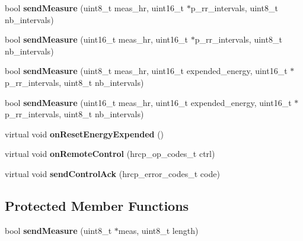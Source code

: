 \begin{DoxyCompactItemize}
\item 
\hypertarget{classble_heart_rate_ab511f6fcb6b7b57c09132911b5f87cb7}{bool {\bfseries send\-Measure} (uint8\-\_\-t meas\-\_\-hr, uint16\-\_\-t $\ast$p\-\_\-rr\-\_\-intervals, uint8\-\_\-t nb\-\_\-intervals)}\label{classble_heart_rate_ab511f6fcb6b7b57c09132911b5f87cb7}

\item 
\hypertarget{classble_heart_rate_a1d3fd3348703d304cd445620e7bb4998}{bool {\bfseries send\-Measure} (uint16\-\_\-t meas\-\_\-hr, uint16\-\_\-t $\ast$p\-\_\-rr\-\_\-intervals, uint8\-\_\-t nb\-\_\-intervals)}\label{classble_heart_rate_a1d3fd3348703d304cd445620e7bb4998}

\item 
\hypertarget{classble_heart_rate_a2a6d1f10ea9a92ad5a953fc683125c50}{bool {\bfseries send\-Measure} (uint8\-\_\-t meas\-\_\-hr, uint16\-\_\-t expended\-\_\-energy, uint16\-\_\-t $\ast$p\-\_\-rr\-\_\-intervals, uint8\-\_\-t nb\-\_\-intervals)}\label{classble_heart_rate_a2a6d1f10ea9a92ad5a953fc683125c50}

\item 
\hypertarget{classble_heart_rate_ab5cf3fd6c2e5909af4d51150c865d8b0}{bool {\bfseries send\-Measure} (uint16\-\_\-t meas\-\_\-hr, uint16\-\_\-t expended\-\_\-energy, uint16\-\_\-t $\ast$p\-\_\-rr\-\_\-intervals, uint8\-\_\-t nb\-\_\-intervals)}\label{classble_heart_rate_ab5cf3fd6c2e5909af4d51150c865d8b0}

\item 
\hypertarget{classble_heart_rate_a4764687c0e158518141b3dba9103b5d2}{virtual void {\bfseries on\-Reset\-Energy\-Expended} ()}\label{classble_heart_rate_a4764687c0e158518141b3dba9103b5d2}

\item 
\hypertarget{classble_heart_rate_acb154368f597857420eb8882f07168f3}{virtual void {\bfseries on\-Remote\-Control} (hrcp\-\_\-op\-\_\-codes\-\_\-t ctrl)}\label{classble_heart_rate_acb154368f597857420eb8882f07168f3}

\item 
\hypertarget{classble_heart_rate_a5123ea3b2062d51ed5e23d469f429c38}{virtual void {\bfseries send\-Control\-Ack} (hrcp\-\_\-error\-\_\-codes\-\_\-t code)}\label{classble_heart_rate_a5123ea3b2062d51ed5e23d469f429c38}

\end{DoxyCompactItemize}
\subsection*{Protected Member Functions}
\begin{DoxyCompactItemize}
\item 
\hypertarget{classble_heart_rate_af7c01e6828e14dc2a8fbea71b4e8a24b}{bool {\bfseries send\-Measure} (uint8\-\_\-t $\ast$meas, uint8\-\_\-t length)}\label{classble_heart_rate_af7c01e6828e14dc2a8fbea71b4e8a24b}

\end{DoxyCompactItemize}
